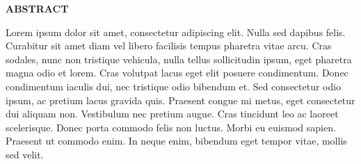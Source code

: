 {}
\begin{center}
    \textbf{ABSTRACT}
\end{center}

Lorem ipsum dolor sit amet, consectetur adipiscing elit. Nulla sed dapibus felis. Curabitur sit amet diam vel libero facilisis tempus pharetra vitae arcu. Cras sodales, nunc non tristique vehicula, nulla tellus sollicitudin ipsum, eget pharetra magna odio et lorem. Cras volutpat lacus eget elit posuere condimentum. Donec condimentum iaculis dui, nec tristique odio bibendum et. Sed consectetur odio ipsum, ac pretium lacus gravida quis. Praesent congue mi metus, eget consectetur dui aliquam non. Vestibulum nec pretium augue. Cras tincidunt leo ac laoreet scelerisque. Donec porta commodo felis non luctus. Morbi eu euismod sapien. Praesent ut commodo enim. In neque enim, bibendum eget tempor vitae, mollis sed velit. 


